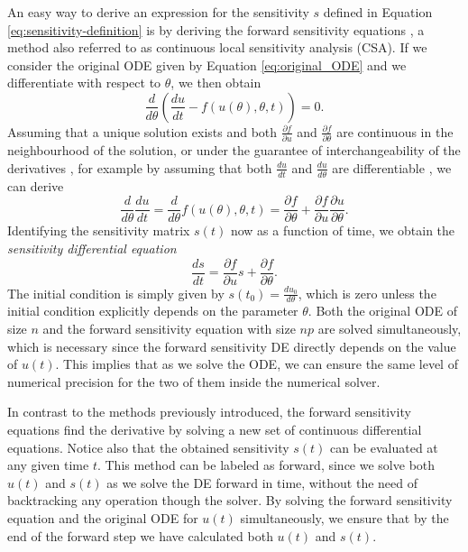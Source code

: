 An easy way to derive an expression for the sensitivity $s$ defined in Equation \eqref{eq:sensitivity-definition} is by deriving the forward sensitivity equations \cite{ramsay2017dynamic}, a method also referred to as continuous local sensitivity analysis (CSA). 
If we consider the original ODE given by Equation \eqref{eq:original_ODE} and we differentiate with respect to $\theta$, we then obtain
\begin{equation}
    \frac{d}{d\theta} \left( \frac{du}{dt}  - f(u(\theta), \theta, t) \right) = 0.
\end{equation}
Assuming that a unique solution exists and both $\frac{\partial f}{\partial u}$ and $\frac{\partial f}{\partial \theta}$ are continuous in the neighbourhood of the solution, or under the guarantee of interchangeability of the derivatives \cite{gronwall1919note}, for example by assuming that both $\frac{du}{dt}$ and $\frac{du}{d\theta}$ are differentiable \cite{math8111947}, we can derive
\begin{equation}
 \frac{d}{d\theta} \frac{du}{dt} 
 =
 \frac{d}{d\theta} f(u(\theta), \theta, t)
 = 
 \frac{\partial f}{\partial \theta}
 + 
 \frac{\partial f}{\partial u} \frac{\partial u}{\partial \theta}.
\end{equation}
Identifying the sensitivity matrix $s(t)$ now as a function of time, we obtain the \textit{sensitivity differential equation} 
\begin{equation}
 \frac{ds}{dt} = \frac{\partial f}{\partial u} s + \frac{\partial f}{\partial \theta}.
 \label{eq:sensitivity_equations}
\end{equation}
The initial condition is simply given by $s(t_0) = \frac{du_0}{d\theta}$, which is zero unless the initial condition explicitly depends on the parameter $\theta$.
Both the original ODE of size $n$ and the forward sensitivity equation with size $np$ are solved simultaneously, which is necessary since the forward sensitivity DE directly depends on the value of $u(t)$.  
This implies that as we solve the ODE, we can ensure the same level of numerical precision for the two of them inside the numerical solver.

In contrast to the methods previously introduced, the forward sensitivity equations find the derivative by solving a new set of continuous differential equations.
Notice also that the obtained sensitivity $s(t)$ can be evaluated at any given time $t$. 
This method can be labeled as forward, since we solve both $u(t)$ and $s(t)$ as we solve the DE forward in time, without the need of backtracking any operation though the solver.
By solving the forward sensitivity equation and the original ODE for $u(t)$ simultaneously, we ensure that by the end of the forward step we have calculated both $u(t)$ and $s(t)$. 